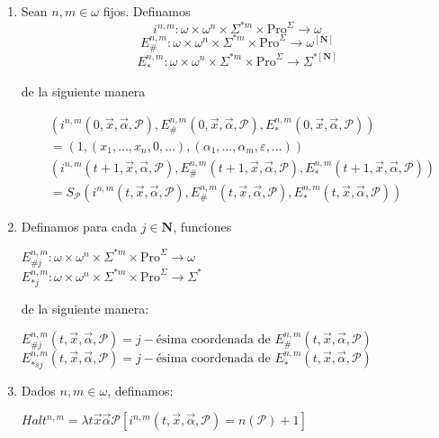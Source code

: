 \documentclass{article}
\begin{document}
\begin{enumerate}
    \item Sean $n, m \in \omega$ fijos. Definamos
    \[
        i^{n,m} : \omega \times \omega^n \times \Sigma^{*m} \times \text{Pro}^\Sigma \to \omega
        \]
        \[
        E_{\#}^{n,m} : \omega \times \omega^n \times \Sigma^{*m} \times \text{Pro}^\Sigma \to \omega^{[\mathbf{N}]}
        \]
        \[
        E_{*}^{n,m} : \omega \times \omega^n \times \Sigma^{*m} \times \text{Pro}^\Sigma \to \Sigma^{*[\mathbf{N}]}
    \]

de la siguiente manera

\begin{align*}
&(i^{n,m}(0, \vec{x}, \vec{\alpha}, \mathcal{P}), E_{\#}^{n,m}(0, \vec{x}, \vec{\alpha}, \mathcal{P}), E_{*}^{n,m}(0, \vec{x}, \vec{\alpha}, \mathcal{P})) \\
&= (1, (x_1, ..., x_n, 0, ...), (\alpha_1, ..., \alpha_m, \varepsilon, ...)) \\
&(i^{n,m}(t+1, \vec{x}, \vec{\alpha}, \mathcal{P}), E_{\#}^{n,m}(t+1, \vec{x}, \vec{\alpha}, \mathcal{P}), E_{*}^{n,m}(t+1, \vec{x}, \vec{\alpha}, \mathcal{P})) \\
&= S_\mathcal{P}(i^{n,m}(t, \vec{x}, \vec{\alpha}, \mathcal{P}), E_{\#}^{n,m}(t, \vec{x}, \vec{\alpha}, \mathcal{P}), E_{*}^{n,m}(t, \vec{x}, \vec{\alpha}, \mathcal{P}))
\end{align*}

\item Definamos para cada $j \in \mathbf{N}$, funciones
\begin{center}
    $E_{\#j}^{n, m} : \omega \times \omega^n \times \Sigma^{*m} \times \text{Pro}^{\Sigma} \rightarrow \omega$\\
    $E_{*j}^{n, m} : \omega \times \omega^n \times \Sigma^{*m} \times \text{Pro}^{\Sigma} \rightarrow \Sigma^{*}$\\
\end{center}
de la siguiente manera:
\begin{center}
    $E_{\#j}^{n, m}(t, \vec{x}, \vec{\alpha}, \mathcal{P}) = j-\text{ésima coordenada de } E_{\#}^{n, m}(t, \vec{x}, \vec{\alpha}, \mathcal{P})$\\
    $E_{*sj}^{n, m}(t, \vec{x}, \vec{\alpha}, \mathcal{P}) = j-\text{ésima coordenada de } E_{*}^{n, m}(t, \vec{x}, \vec{\alpha}, \mathcal{P})$\\
\end{center}

\item Dados $n, m \in \omega$, definamos:
\begin{center}
    $Halt^{n, m} = \lambda t \vec{x} \vec{\alpha} \mathcal{P} [i^{n, m}(t, \vec{x}, \vec{\alpha}, \mathcal{P}) = n(\mathcal{P}) + 1]$
\end{center}


\end{enumerate}
\end{document}
